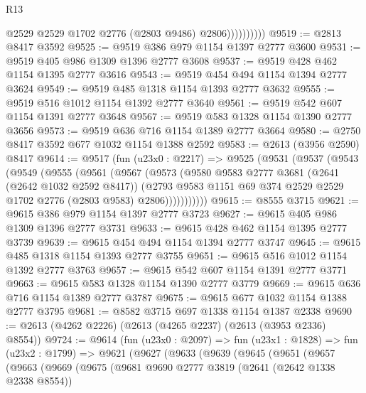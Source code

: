 \begin{lexlean}{R13}
\begin{coremodule}
                        @2529
                        @2529
                        @1702
                        @2776
                        (@2803 @9486)
                        @2806))))))))))
@9519 := @2813 @8417 @3592
@9525 := @9519 @386 @979 @1154 @1397 @2777 @3600
@9531 := @9519 @405 @986 @1309 @1396 @2777 @3608
@9537 := @9519 @428 @462 @1154 @1395 @2777 @3616
@9543 := @9519 @454 @494 @1154 @1394 @2777 @3624
@9549 := @9519 @485 @1318 @1154 @1393 @2777 @3632
@9555 := @9519 @516 @1012 @1154 @1392 @2777 @3640
@9561 := @9519 @542 @607 @1154 @1391 @2777 @3648
@9567 := @9519 @583 @1328 @1154 @1390 @2777 @3656
@9573 := @9519 @636 @716 @1154 @1389 @2777 @3664
@9580 := @2750 @8417 @3592 @677 @1032 @1154 @1388 @2592
@9583 := @2613 (@3956 @2590) @8417
@9614 := @9517
    (fun (u23x0 : @2217) =>
    @9525
      (@9531
        (@9537
          (@9543
            (@9549
              (@9555
                (@9561
                  (@9567
                    (@9573
                      (@9580
                        @9583
                        @2777
                        @3681
                        (@2641 (@2642 @1032 @2592 @8417))
                        (@2793
                          @9583
                          @1151
                          @69
                          @374
                          @2529
                          @2529
                          @1702
                          @2776
                          (@2803 @9583)
                          @2806)))))))))))
@9615 := @8555 @3715
@9621 := @9615 @386 @979 @1154 @1397 @2777 @3723
@9627 := @9615 @405 @986 @1309 @1396 @2777 @3731
@9633 := @9615 @428 @462 @1154 @1395 @2777 @3739
@9639 := @9615 @454 @494 @1154 @1394 @2777 @3747
@9645 := @9615 @485 @1318 @1154 @1393 @2777 @3755
@9651 := @9615 @516 @1012 @1154 @1392 @2777 @3763
@9657 := @9615 @542 @607 @1154 @1391 @2777 @3771
@9663 := @9615 @583 @1328 @1154 @1390 @2777 @3779
@9669 := @9615 @636 @716 @1154 @1389 @2777 @3787
@9675 := @9615 @677 @1032 @1154 @1388 @2777 @3795
@9681 := @8582 @3715 @697 @1338 @1154 @1387 @2338
@9690 := @2613 (@4262 @2226) (@2613 (@4265 @2237) (@2613 (@3953 @2336) @8554))
@9724 := @9614
    (fun (u23x0 : @2097) =>
    fun (u23x1 : @1828) =>
    fun (u23x2 : @1799) =>
    @9621
      (@9627
        (@9633
          (@9639
            (@9645
              (@9651
                (@9657
                  (@9663
                    (@9669
                      (@9675
                        (@9681
                          @9690
                          @2777
                          @3819
                          (@2641 (@2642 @1338 @2338 @8554))

\end{coremodule}
\end{lexlean}
